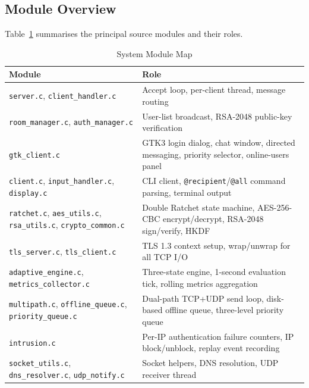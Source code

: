 \documentclass[conference]{IEEEtran}
\begin{document}
\subsection{Module Overview}

Table~\ref{tab:modules} summarises the principal source modules and their roles.

\begin{table}[t]
\caption{System Module Map}
\label{tab:modules}
\begin{center}
\begin{tabular}{|l|p{10cm}|}
\hline
\textbf{Module} & \textbf{Role} \\
\hline
\texttt{server.c}, \texttt{client\_handler.c} & Accept loop, per-client thread, message routing \\
\hline
\texttt{room\_manager.c}, \texttt{auth\_manager.c} & User-list broadcast, RSA-2048 public-key verification \\
\hline
\texttt{gtk\_client.c} & GTK3 login dialog, chat window, directed messaging, priority selector, online-users panel \\
\hline
\texttt{client.c}, \texttt{input\_handler.c}, \texttt{display.c} & CLI client, \texttt{@recipient}/\texttt{@all} command parsing, terminal output \\
\hline
\texttt{ratchet.c}, \texttt{aes\_utils.c}, \texttt{rsa\_utils.c}, \texttt{crypto\_common.c} & Double Ratchet state machine, AES-256-CBC encrypt/decrypt, RSA-2048 sign/verify, HKDF \\
\hline
\texttt{tls\_server.c}, \texttt{tls\_client.c} & TLS 1.3 context setup, wrap/unwrap for all TCP I/O \\
\hline
\texttt{adaptive\_engine.c}, \texttt{metrics\_collector.c} & Three-state engine, 1-second evaluation tick, rolling metrics aggregation \\
\hline
\texttt{multipath.c}, \texttt{offline\_queue.c}, \texttt{priority\_queue.c} & Dual-path TCP+UDP send loop, disk-based offline queue, three-level priority queue \\
\hline
\texttt{intrusion.c} & Per-IP authentication failure counters, IP block/unblock, replay event recording \\
\hline
\texttt{socket\_utils.c}, \texttt{dns\_resolver.c}, \texttt{udp\_notify.c} & Socket helpers, DNS resolution, UDP receiver thread \\
\hline
\end{tabular}
\end{center}
\end{table}
\end{document}
